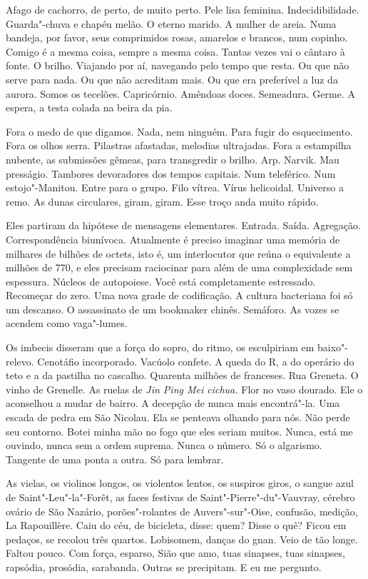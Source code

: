 Afago de cachorro, de perto, de muito perto. Pele lisa feminina.
Indecidibilidade. Guarda"-chuva e chapéu melão. O eterno marido. A mulher
de areia. Numa bandeja, por favor, seus comprimidos rosas, amarelos e
brancos, num copinho. Comigo é a mesma coisa, sempre a mesma coisa.
Tantas vezes vai o cântaro à fonte. O brilho. Viajando por aí, navegando
pelo tempo que resta. Ou que não serve para nada. Ou que não acreditam
mais. Ou que era preferível a luz da aurora. Somos os tecelões.
Capricórnio. Amêndoas doces. Semeadura. Germe. A espera, a testa colada
na beira da pia.

Fora o medo de que digamos. Nada, nem ninguém. Para fugir do
esquecimento. Fora os olhos serra. Pilastras afastadas, melodias
ultrajadas. Fora a estampilha nubente, as submissões gêmeas, para
transgredir o brilho. Arp. Narvik. Mau presságio. Tambores devoradores
dos tempos capitais. Num teleférico. Num estojo"-Manitou. Entre para o
grupo. Filo vítrea. Vírus helicoidal. Universo a remo. As dunas
circulares, giram, giram. Esse troço anda muito rápido.

Eles partiram da hipótese de mensagens elementares. Entrada. Saída.
Agregação. Correspondência biunívoca. Atualmente é preciso imaginar uma
memória de milhares de bilhões de octets, isto é, um interlocutor que
reúna o equivalente a milhões de  770, e eles precisam raciocinar
para além de uma complexidade sem espessura. Núcleos de autopoiese. Você
está completamente estressado. Recomeçar do zero. Uma nova grade de
codificação. A cultura bacteriana foi só um descanso. O assassinato de
um bookmaker chinês. Semáforo. As vozes se acendem como vaga"-lumes.

Os imbecis disseram que a força do sopro, do ritmo, os esculpiriam em
baixo"-relevo. Cenotáfio incorporado. Vacúolo confete. A queda do R, a do
operário do teto e a da pastilha no cascalho. Quarenta milhões de
franceses. Rua Greneta. O vinho de Grenelle. As ruelas de \emph{Jin Ping
Mei cichua.} Flor no vaso dourado. Ele o aconselhou a mudar de bairro. A
decepção de nunca mais encontrá"-la. Uma escada de pedra em São Nicolau.
Ela se penteava olhando para nós. Não perde seu contorno. Botei minha
mão no fogo que eles seriam muitos. Nunca, está me ouvindo, nunca sem a
ordem suprema. Nunca o número. Só o algarismo. Tangente de uma ponta a
outra. Só para lembrar.

As vielas, os violinos longos, os violentos lentos, os suspiros giros, o
sangue azul de Saint"-Leu"-la"-Forêt, as faces festivas de
Saint"-Pierre"-du"-Vauvray, cérebro ovário de São Nazário, porões"-rolantes
de Auvers"-sur"-Oise, confusão, medição, La Rapouillère. Caiu do céu, de
bicicleta, disse: quem? Disse o quê? Ficou em pedaços, se recolou três
quartos. Lobisomem, danças do gnan. Veio de tão longe. Faltou pouco. Com
força, esparso, Sião que amo, tuas sinapses, tuas sinapses, rapsódia,
prosódia, sarabanda. Outras se precipitam. E eu me pergunto.

